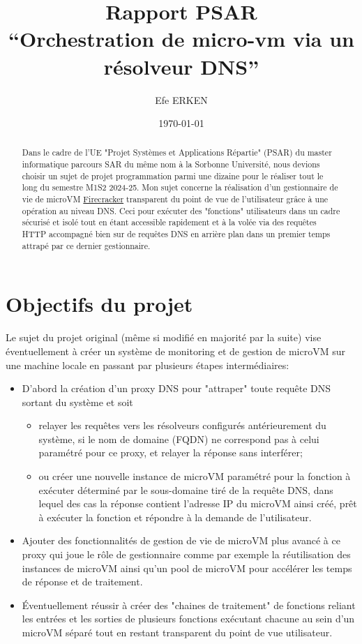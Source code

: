 \documentclass[12pt]{article}
\author{Efe ERKEN}
\date{\today}
\title{Rapport PSAR  \\ ``Orchestration de micro-vm via un résolveur DNS''}
\begin{document}
\maketitle

\begin{abstract}
	Dans le cadre de l'UE "Projet Systèmes et Applications Répartie" (PSAR) du master informatique parcours SAR du même nom à la Sorbonne Université, nous devions choisir un sujet de projet programmation parmi une dizaine pour le réaliser tout le long du semestre M1S2 2024-25. Mon sujet concerne la réalisation d'un gestionnaire de vie de microVM \href{https://firecracker-microvm.github.io/}{Firecracker} transparent du point de vue de l'utilisateur grâce à une opération au niveau DNS. Ceci pour exécuter des "fonctions" utilisateurs dans un cadre sécurisé et isolé tout en étant accessible rapidement et à la volée via des requêtes HTTP accompagné bien sur de requêtes DNS en arrière plan dans un premier temps attrapé par ce dernier gestionnaire.
\end{abstract}

\section{Objectifs du projet}
Le sujet du projet original (même si modifié en majorité par la suite) vise éventuellement à créer un système de monitoring et de gestion de microVM sur une machine locale en passant par plusieurs étapes intermédiaires:

\begin{itemize}
	\item D'abord la création d'un proxy DNS pour "attraper" toute requête DNS sortant du système et soit
		\begin{itemize}
			\item relayer les requêtes vers les résolveurs configurés antérieurement du système, si le nom de domaine (FQDN) ne correspond pas à celui paramétré pour ce proxy, et relayer la réponse sans interférer;
			\item ou créer une nouvelle instance de microVM paramétré pour la fonction à exécuter déterminé par le sous-domaine tiré de la requête DNS, dans lequel des cas la réponse contient l'adresse IP du microVM ainsi créé, prêt à exécuter la fonction et répondre à la demande de l'utilisateur.
		\end{itemize}
	\item Ajouter des fonctionnalités de gestion de vie de microVM plus avancé à ce proxy qui joue le rôle de gestionnaire comme par exemple la réutilisation des instances de microVM ainsi qu'un pool de microVM pour accélérer les temps de réponse et de traitement.
	\item Éventuellement réussir à créer des "chaines de traitement" de fonctions reliant les entrées et les sorties de plusieurs fonctions exécutant chacune au sein d'un microVM séparé tout en restant transparent du point de vue utilisateur.
\end{itemize}
\end{document}
